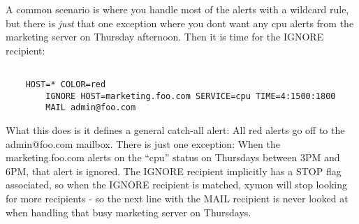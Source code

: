  A common scenario is where you handle most of the alerts with a wildcard rule, but there is \emph{just}
 that one exception where you dont want any cpu alerts from the marketing server on Thursday afternoon. Then it is time for the IGNORE recipient:
\begin{verbatim}

	HOST=* COLOR=red
		IGNORE HOST=marketing.foo.com SERVICE=cpu TIME=4:1500:1800
		MAIL admin@foo.com

\end{verbatim}



 What this does is it defines a general catch-all alert: All red alerts go off to the admin@foo.com mailbox. There is just one exception: When the marketing.foo.com alerts on the ``cpu'' status on Thursdays between 3PM and 6PM, that alert is ignored. The IGNORE recipient implicitly has a STOP flag associated, so when the IGNORE recipient is matched, xymon will stop looking for more recipients - so the next line with the MAIL recipient is never looked at when handling that busy marketing server on Thursdays.

